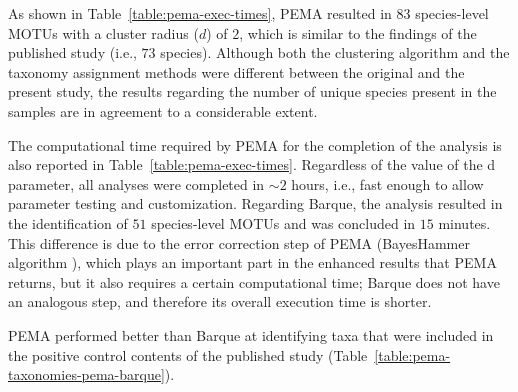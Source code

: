    As shown in Table~\ref{table:pema-exec-times}, PEMA resulted in 83 species-level MOTUs with a cluster radius ($d$) of $2$, which is similar to the findings of the published study (i.e., $73$ species). 
   Although both the clustering algorithm and the taxonomy assignment methods were different between the original \citep{bista2017annual} and the present study, the results regarding the number of unique species present in the samples are in agreement to a considerable extent.

   The computational time required by PEMA for the completion of the analysis is also reported in Table~\ref{table:pema-exec-times}. 
   Regardless of the value of the d parameter, all analyses were completed in $∼2$ hours, i.e., fast enough to allow parameter testing and customization.
   Regarding Barque, the analysis resulted in the identification of $51$ species-level MOTUs and was concluded in $15$ minutes. 
   This difference is due to the error correction step of PEMA (BayesHammer algorithm \citep{nikolenko2013bayeshammer}), which plays an important part in the enhanced results that PEMA returns, but it also requires a certain computational time; 
   Barque does not have an analogous step, and therefore its overall execution time is shorter.
   
   PEMA performed better than Barque at identifying taxa that were included in the positive control contents of the published study (Table~\ref{table:pema-taxonomies-pema-barque}).

